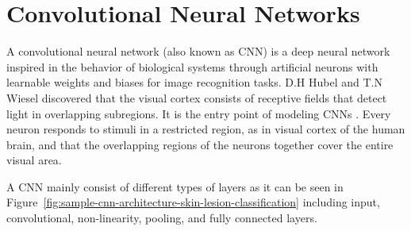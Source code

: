 \section{Convolutional Neural Networks}

    A convolutional neural network (also known as CNN) is a deep neural network inspired in the behavior of biological systems through artificial neurons with learnable weights and biases for image recognition tasks.
    D.H Hubel and T.N Wiesel discovered that the visual cortex consists of receptive fields that detect light in overlapping subregions.
    It is the entry point of modeling CNNs \cite{hubel1968receptive}.
    Every neuron responds to stimuli in a restricted region, as in visual cortex of the human brain, and that the overlapping regions of the neurons together cover the entire visual area.

    

    A CNN mainly consist of different types of layers as it can be seen in Figure~\ref{fig:sample-cnn-architecture-skin-lesion-classification} including input, convolutional, non-linearity, pooling, and fully connected layers.

